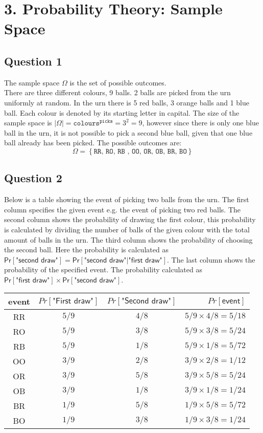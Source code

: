 \documentclass{article}
\begin{document}
\section{3. Probability Theory: Sample Space}
\subsection{Question 1}
The sample space $\Omega$ is the set of possible outcomes. \\
There are three different colours, 9 balls. 2  balls are picked from the urn uniformly at random. In the urn there is 5 red balls, 3 orange balls and 1 blue ball. Each colour is denoted by its starting letter in capital. The size of the sample space is $|\Omega| = \texttt{colours}^{\texttt{picks}} = 3^2 = 9$, however since there is only one blue ball in the urn, it is not possible to pick a second blue ball, given that one blue ball already has been picked. The possible outcomes are:
$$ \Omega = \left\lbrace \texttt{RR, RO, RB , OO, OR, OB, BR, BO} \right\rbrace $$
\subsection{Question 2}
Below is a table showing the event of picking two balls from the urn. The first column specifies the given event e.g. the event of picking two red balls. The second column shows the probability of drawing the first colour, this probability is calculated by dividing the number of balls of the given colour with the total amount of balls in the urn. The third column shows the probability of choosing the second ball. Here the probability is calculated as 
$ \textsf{Pr}[\textsf{"second draw"}] = \textsf{Pr}[\textsf{"second draw"} \vert \textsf{"first draw"}]$.  The last column shows the probability of the specified event. The probability  calculated as $ \textsf{Pr}[\textsf{"first draw"}] \times \textsf{Pr}[\textsf{"second draw"}]$.
\begin{table}[H]
  \centering
  \label{tab:table1}
  \begin{tabular}{c|c|c||r}
    \textsf{event} & $Pr[\textsf{"First draw"}]$ & $Pr[\textsf{"Second draw"}]$ & $Pr[\textsf{event}]$ \\
    \hline
    RR & $5/9$ & $4/8$ &  $ 5/9 \times 4/8 = 5/18$\\
    RO & $5/9$ & $3/8$ &  $ 5/9 \times 3/8 = 5/24$\\
    RB & $5/9$ & $1/8$ &  $ 5/9 \times 1/8 = 5/72$\\
    OO & $3/9$ & $2/8$ &  $ 3/9 \times 2/8 = 1/12$\\
    OR & $3/9$ & $5/8$ &  $ 3/9 \times 5/8 = 5/24$\\
    OB & $3/9$ & $1/8$ &  $ 3/9 \times 1/8 = 1/24$\\
    BR & $1/9$ & $5/8$ &  $ 1/9 \times 5/8 = 5/72$\\
    BO & $1/9$ & $3/8$ &  $ 1/9 \times 3/8 = 1/24$\\
  \end{tabular}
\end{table}
\end{document}
